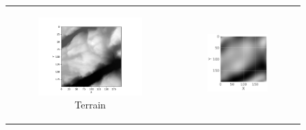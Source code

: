 \begin{figure}[t]
    \centering
    \begin{tabular}{cc}
        \begin{subfigure}[b]{0.49\textwidth}
            \centering
            \includegraphics[width=\textwidth]{examples/tests_even/figs/terrain-map.pdf}
            \caption{Terrain}
            \label{fig:terrain1}
        \end{subfigure} &
        \begin{subfigure}[b]{0.37\textwidth}
            \centering
            \includegraphics[width=\textwidth]{latex/figures/ridge_terrain1_prediction.pdf}

\end{subfigure}
\end{tabular}
\end{figure}

